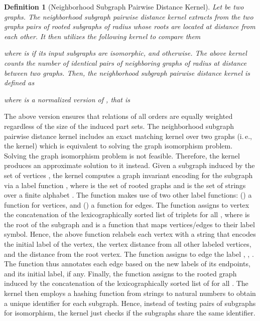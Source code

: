 \documentclass[twoside,11pt]{article}
\newcommand{\ie}{i.\,e., }
\newtheorem{definition}{Definition}
\begin{document}
\begin{definition}[Neighborhood Subgraph Pairwise Distance Kernel]
	Let  be two graphs.
	The neighborhood subgraph pairwise distance kernel extracts from the two graphs pairs of rooted subgraphs of radius  whose roots are located at distance  from each other.
	It then utilizes the following kernel to compare them
	
	where  is  if its input subgraphs are isomorphic, and  otherwise.
	The above kernel counts the number of identical pairs of neighboring graphs of radius  at distance  between two graphs.
	Then, the neighborhood subgraph pairwise distance kernel is defined as
	
	where  is a normalized version of , that is
	
\end{definition}
The above version ensures that relations of all orders are equally weighted regardless of the size of the induced part sets.
The neighborhood subgraph pairwise distance kernel includes an exact matching kernel over two graphs (\ie the  kernel) which is equivalent to solving the graph isomorphism problem.
Solving the graph isomorphism problem is not feasible.
Therefore, the kernel produces an approximate solution to it instead.
Given a subgraph  induced by the set of vertices , the kernel computes a graph invariant encoding for the subgraph via a label function , where  is the set of rooted graphs and  is the set of strings over a finite alphabet .
The function  makes use of two other label functions: () a function  for vertices, and () a function  for edges.
The  function assigns to vertex  the concatenation of the lexicographically sorted list of triplets  for all , where  is the root of the subgraph and  is a function that maps vertices/edges to their label symbol.
Hence, the above function relabels each vertex with a string that encodes the initial label of the vertex, the vertex distance from all other labeled vertices, and the distance from the root vertex.
The  function assigns to edge  the label , , .
The  function thus annotates each edge based on the new labels of its endpoints, and its initial label, if any.
Finally, the function  assigns to the rooted graph induced by  the concatenation of the lexicographically sorted list of  for all .
The kernel then employs a hashing function from strings to natural numbers  to obtain a unique identifier for each subgraph.
Hence, instead of testing pairs of subgraphs for isomorphism, the kernel just checks if the subgraphs share the same identifier.
\end{document}
